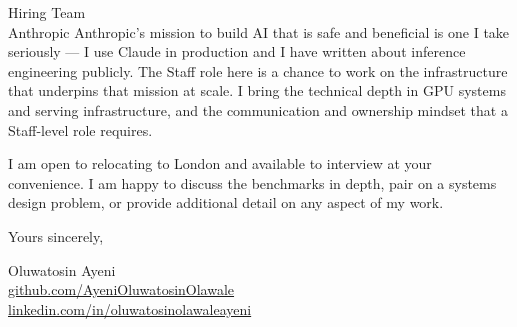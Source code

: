 \documentclass[12pt,a4paper]{letter}
\begin{document}
\begin{letter}{Hiring Team \\ Anthropic}
Anthropic's mission to build AI that is safe and beneficial is one I take seriously — I use Claude in production and I have written about inference engineering publicly. The Staff role here is a chance to work on the infrastructure that underpins that mission at scale. I bring the technical depth in GPU systems and serving infrastructure, and the communication and ownership mindset that a Staff-level role requires.

I am open to relocating to London and available to interview at your convenience. I am happy to discuss the benchmarks in depth, pair on a systems design problem, or provide additional detail on any aspect of my work.

\closing{Yours sincerely,}

Oluwatosin Ayeni \\
\href{https://github.com/AyeniOluwatosinOlawale}{github.com/AyeniOluwatosinOlawale} \\
\href{https://www.linkedin.com/in/oluwatosinolawaleayeni/}{linkedin.com/in/oluwatosinolawaleayeni}

\end{letter}
\end{document}
